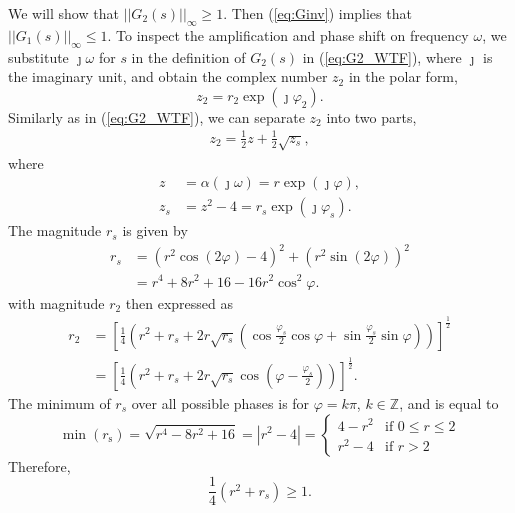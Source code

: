\documentclass[final,5p,times,twocolumn]{elsarticle}
\begin{document}
We will show that $||G_2(s)||_{\infty} \geq 1$. Then (\ref{eq:Ginv}) implies that $||G_1(s)||_{\infty} \leq 1$. To inspect the amplification and phase shift on frequency $\omega$, we substitute $\jmath\omega$ for $s$ in the definition of $G_2(s)$ in (\ref{eq:G2_WTF}), where $\jmath$ is the imaginary unit, and obtain the complex number $z_2$ in the polar form,
\begin{equation}
  z_2 = r_2 \exp(\jmath \varphi_2).
\end{equation}
Similarly as in (\ref{eq:G2_WTF}), we can separate $z_2$ into two parts,
\begin{align}
  z_2 = \frac{1}{2}z + \frac{1}{2}\sqrt{z_s},
\end{align}
where
\begin{align}
z &= \alpha(\jmath\omega) = r \exp(\jmath \varphi), \nonumber\\
z_s &= z^2-4 = r_s \exp(\jmath \varphi_s).
\label{eq:app_zs}
\end{align}
The magnitude $r_s$ is given by
\begin{align}
  r_s &=  (r^2\cos(2\varphi)-4)^2 + (r^2\sin(2\varphi))^2 \nonumber \\
  &= r^4+8r^2+16-16r^2\cos^2\varphi.
\end{align}
with magnitude $r_2$ then expressed as
\begin{align}
  r_2 &=
   \left[ \frac{1}{4} \left(r^2 +r_s +2r\sqrt{r_s} \left(\cos\frac{\varphi_s}{2}\cos\varphi+\sin \frac{\varphi_s}{2}\sin\varphi\right) \right) \right]^{\frac{1}{2}} \nonumber\\
  &= \left[\frac{1}{4} \left(r^2 +r_s +2r\sqrt{r_s} \cos\left(\varphi-\frac{\varphi_s}{2} \right)\right) \right]^{\frac{1}{2}}.\label{eq:app_r2}
\end{align}
The minimum of $r_s$ over all possible phases is for $\varphi = k \pi$, $k\in \mathbb{Z}$, and is equal to
\begin{equation}
  \min(r_{\text{s}}) = \sqrt{r^4-8r^2+16} = |r^2-4| =
  \begin{cases}
    4-r^2 & \text{if } 0 \leq r \leq 2 \\
    r^2-4 & \text{if } r > 2
  \end{cases}
\end{equation}
Therefore,
\begin{equation}
  \frac{1}{4}(r^2+r_s) \geq 1. \label{eq:app_r_and_rs}
\end{equation}
\end{document}
